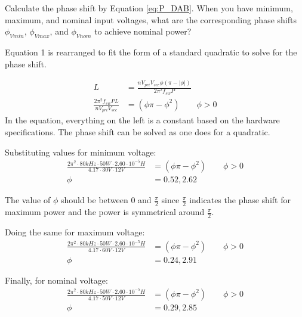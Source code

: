 \documentclass{PELsmallreport}
\begin{document}
Calculate the phase shift by Equation \ref{eq:P_DAB}. When you have minimum, maximum, and nominal input voltages, what are the corresponding phase shifts $\phi_{Vmin}$, $\phi_{Vmax}$, and $\phi_{Vnom}$ to achieve nominal power?

    \begin{framed}
        \vspace{1em}
        Equation 1 is rearranged to fit the form of a standard quadratic to solve for the phase shift. 
        
        \begin{align}
            L &= \frac{n V_{pri} V_{sec}\phi ( \pi-|\phi| ) }{2\pi^2f_{sw}P} \\
            \frac{2\pi^2f_{sw}PL}{n V_{pri} V_{sec}} &= ( \phi\pi-\phi^2 ) \quad\quad \phi > 0
        \end{align}
        In the equation, everything on the left is a constant based on the hardware specifications. The phase shift can be solved as one does for a quadratic.
        
        Substituting values for minimum voltage:
       \begin{align}
            \frac{2\pi^2\cdot 80kHz \cdot 50W \cdot 2.60 \cdot 10^{-5}H}{4.17 \cdot 30V \cdot 12V} &= ( \phi\pi-\phi^2 ) \quad\quad \phi > 0 \\
            \phi &= 0.52, 2.62
        \end{align}

        The value of $\phi$ should be between 0 and $\frac{\pi}{2}$ since $\frac{\pi}{2}$ indicates the phase shift for maximum power and the power is symmetrical around $\frac{\pi}{2}$. 
        
        Doing the same for maximum voltage:
        \begin{align}
            \frac{2\pi^2\cdot 80kHz \cdot 50W \cdot 2.60 \cdot 10^{-5}H}{4.17 \cdot 60V \cdot 12V} &= ( \phi\pi-\phi^2 ) \quad\quad \phi > 0 \\
            \phi &= 0.24, 2.91
        \end{align}

        Finally, for nominal voltage:
        \begin{align}
            \frac{2\pi^2\cdot 80kHz \cdot 50W \cdot 2.60 \cdot 10^{-5}H}{4.17 \cdot 50V \cdot 12V} &= ( \phi\pi-\phi^2 ) \quad\quad \phi > 0 \\
            \phi &= 0.29, 2.85
        \end{align}
        
        \vspace{1em}
    \end{framed}
            
\end{document}
